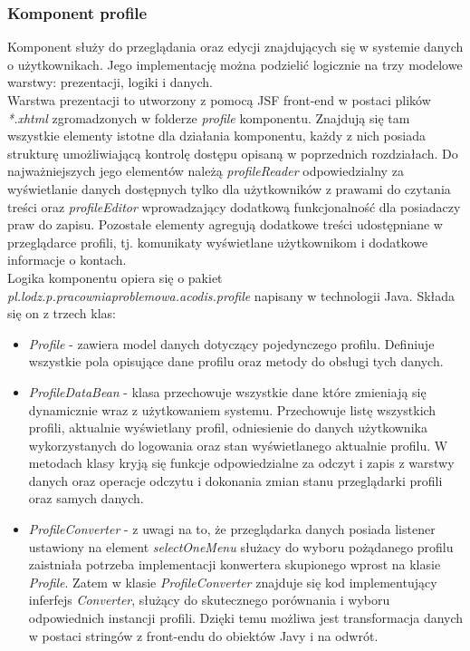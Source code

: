 \documentclass{classrep}
\begin{document}
\subsubsection{Komponent profile}
Komponent służy do przeglądania oraz edycji znajdujących się w systemie danych o użytkownikach. Jego implementację można podzielić logicznie na trzy modelowe warstwy: prezentacji, logiki i danych. \\
Warstwa prezentacji to utworzony z pomocą JSF front-end w postaci plików \textit{*.xhtml} zgromadzonych w folderze \textit{profile} komponentu. Znajdują się tam wszystkie elementy istotne dla działania komponentu, każdy z nich posiada strukturę umożliwiającą kontrolę dostępu opisaną w poprzednich rozdziałach. Do najważniejszych jego elementów należą \textit{profileReader} odpowiedzialny za wyświetlanie danych dostępnych tylko dla użytkowników z prawami do czytania treści oraz \textit{profileEditor} wprowadzający dodatkową funkcjonalność dla posiadaczy praw do zapisu. Pozostałe elementy agregują dodatkowe treści udostępniane w przeglądarce profili, tj. komunikaty wyświetlane użytkownikom i dodatkowe informacje o kontach. \\
Logika komponentu opiera się o pakiet \textit{pl.lodz.p.pracowniaproblemowa.acodis.profile} napisany w technologii Java. Składa się on z trzech klas:
\begin{itemize}
  \item \textit{Profile} - zawiera model danych dotyczący pojedynczego profilu. Definiuje wszystkie pola opisujące dane profilu oraz metody do obsługi tych danych.
  \item \textit{ProfileDataBean} - klasa przechowuje wszystkie dane które zmieniają się dynamicznie wraz z użytkowaniem systemu. Przechowuje listę wszystkich profili, aktualnie wyświetlany profil, odniesienie do danych użytkownika wykorzystanych do logowania oraz stan wyświetlanego aktualnie profilu. W metodach klasy kryją się funkcje odpowiedzialne za odczyt i zapis z warstwy danych oraz operacje odczytu i dokonania zmian stanu przeglądarki profili oraz samych danych.
  \item \textit{ProfileConverter} - z uwagi na to, że przeglądarka danych posiada listener ustawiony na element \textit{selectOneMenu} służacy do wyboru pożądanego profilu zaistniała potrzeba implementacji konwertera skupionego wprost na klasie \textit{Profile}. Zatem w klasie \textit{ProfileConverter} znajduje się kod implementujący inferfejs \textit{Converter}, służący do skutecznego porównania i wyboru odpowiednich instancji profili. Dzięki temu możliwa jest transformacja danych w postaci stringów z front-endu do obiektów Javy i na odwrót.
\end{itemize}
\end{document}
